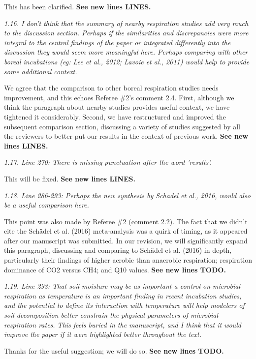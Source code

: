 \documentclass[11pt, oneside]{article}
\begin{document}
This has been clarified. {\bf See new lines LINES.}

\medskip
{\it 1.16. I don't think that the summary of nearby respiration studies add very much to the discussion section. Perhaps if the similarities and discrepancies were more integral to the central findings of the paper or integrated differently into the discussion they would seem more meaningful here. Perhaps comparing with other boreal incubations (eg: Lee et al., 2012; Lavoie et al., 2011) would help to provide some additional context. }

We agree that the comparison to other boreal respiration studies needs improvement, and this echoes Referee \#2's comment 2.4. First, although we think the paragraph about nearby studies provides useful context, we have tightened it considerably. Second, we have restructured and improved the subsequent comparison section, discussing a variety of studies suggested by all the reviewers to better put our results in the context of previous work. {\bf See new lines LINES.}

\medskip
{\it 1.17. Line 270: There is missing punctuation after the word 'results'. }

This will be fixed. {\bf See new lines LINES.}

\medskip
{\it 1.18. Line 286-293: Perhaps the new synthesis by Schadel et al., 2016, would also be a useful comparison here. }

This point was also made by Referee \#2 (comment 2.2). The fact that we didn't cite the Schädel et al. (2016) meta-analysis was a quirk of timing, as it appeared after our manuscript was submitted. In our revision, we will significantly expand this paragraph, discussing and comparing to Schädel et al. (2016) in depth, particularly their findings of higher aerobic than anaerobic respiration; respiration dominance of CO2 versus CH4; and Q10 values. {\bf See new lines TODO.}

\medskip
{\it 1.19. Line 293: That soil moisture may be as important a control on microbial respiration as temperature is an important finding in recent incubation studies, and the potential to define its interaction with temperature will help modelers of soil decomposition better constrain the physical parameters of microbial respiration rates. This feels buried in the manuscript, and I think that it would improve the paper if it were highlighted better throughout the text. }

Thanks for the useful suggestion; we will do so. {\bf See new lines TODO.}
\end{document}
